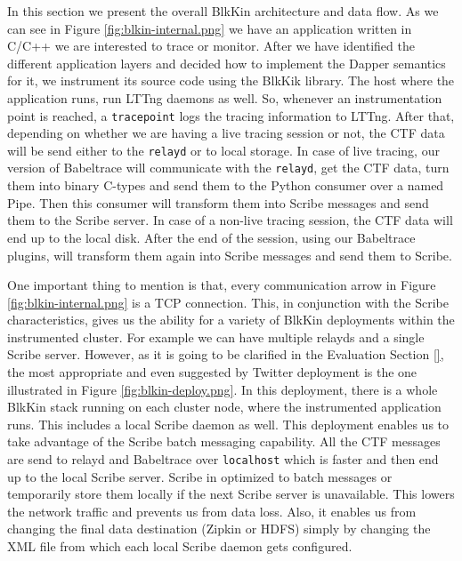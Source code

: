 In this section we present the overall BlkKin architecture and data flow. As we
can see in Figure \ref{fig:blkin-internal.png} we have an application written in
C/C++ we are interested to trace or monitor. After we have identified the
different application layers and decided how to implement the Dapper semantics
for it, we instrument its source code using the BlkKik library. The host where
the application runs, run LTTng daemons as well. So, whenever an instrumentation
point is reached, a \texttt{tracepoint} logs the tracing information to LTTng.
After that, depending on whether we are having a live tracing session or not,
the CTF data will be send either to the \texttt{relayd} or to local storage. In
case of live tracing, our version of Babeltrace will communicate with the
\texttt{relayd}, get the CTF data, turn them into binary C-types and send them
to the Python consumer over a named Pipe. Then this consumer will transform them
into Scribe messages and send them to the Scribe server. In case of a non-live
tracing session, the CTF data will end up to the local disk. After the end of
the session, using our Babeltrace plugins, will transform them again into Scribe
messages and send them to Scribe.


One important thing to mention is that, every communication arrow in Figure
\ref{fig:blkin-internal.png} is a TCP connection. This, in conjunction with the
Scribe characteristics, gives us the ability for a variety of BlkKin deployments
within the instrumented cluster. For example we can have multiple relayds and a
single Scribe server. However, as it is going to be clarified in the Evaluation
Section \ref{}, the most appropriate and even suggested by Twitter deployment is
the one illustrated in Figure \ref{fig:blkin-deploy.png}.  In this deployment,
there is a whole BlkKin stack running on each cluster node, where the
instrumented application runs. This includes a local Scribe daemon as well. This
deployment enables us to take advantage of the Scribe batch messaging
capability. All the CTF messages are send to relayd and Babeltrace over
\texttt{localhost} which is faster and then end up to the local Scribe server.
Scribe in optimized to batch messages or temporarily store them locally if the
next Scribe server is unavailable. This lowers the network traffic and prevents
us from data loss. Also, it enables us from changing the final data destination
(Zipkin or HDFS) simply by changing the XML file from which each local Scribe
daemon gets configured. 

